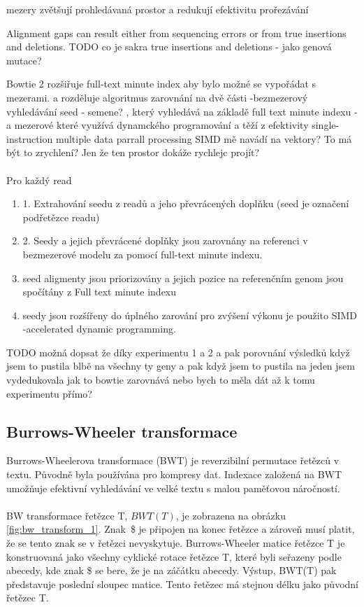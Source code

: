 \documentclass[czech,DP]{thesiskiv}
\numberwithin{equation}{section}
\begin{document}
 mezery zvětšují prohledávaná prostor a redukují efektivitu prořezávání
 
  

Alignment gaps can result either from sequencing errors or from true insertions and deletions. 
TODO co je sakra true insertions and deletions - jako genová mutace? 

Bowtie 2 rozšiřuje full-text minute index aby bylo možné se vypořádat s mezerami.
a rozděluje algoritmus zarovnání na dvě části
-bezmezerový vyhledávání seed - semene? , který vyhledává na základě full text minute indexu
- a mezerové které využívá dynamckého programování a těží z efektivity single- instruction multiple data parrall processing
 SIMD mě navádí na vektory? To má být to zrychlení? Jen že ten prostor dokáže rychlejc projít?
\\
\\
Pro každý read
\begin{enumerate}
	\item 1. Extrahování seedu z readů a jeho převrácených doplňku (seed je označení podřetězce readu) 
	\item 2. Seedy a jejich převrácené doplňky jsou zarovnány na referenci v bezmezerové modelu za pomocí full-text minute indexu.
	\item seed aligmenty jsou priorizovány a jejich pozice na referenčním genom jsou spočítány z Full text minute indexu
	\item seedy jsou rozšířeny do úplného zarování pro zvýšení výkonu je použito SIMD -accelerated dynamic programming.
\end{enumerate}

TODO možná dopsat že díky experimentu 1 a 2 a pak porovnání výsledků když jsem to pustila blbě na všechny ty geny a pak když jsem to pustila na jeden jsem vydedukovala jak to bowtie zarovnává nebo bych to měla dát až k tomu experimentu přímo? 

\subsection{Burrows-Wheeler transformace}
Burrows-Wheelerova transformace (BWT) je reverzibilní permutace řetězců v textu. Původně byla používána pro kompresy dat. Indexace založená na BWT umožňuje efektivní vyhledávání ve velké textu s malou paměťovou náročností. 
\\
\\
BW transformace řetězce T, $BWT(T)$, je zobrazena na obrázku \ref{fig:bw_transform_1}. Znak~\$ je připojen na konec řetězce a zároveň musí platit, že se tento znak se v řetězci nevyskytuje. Burrows-Wheeler matice řetězce T je konstruovaná jako všechny cyklické rotace řetězce T, které byli seřazeny podle abecedy, kde znak \$ se bere, že je na záčátku abecedy. Výstup, BWT(T) pak představuje poslední sloupec matice. Tento řetězec má stejnou délku jako původní řetězec T. \cite{bowtie} 
\end{document}
